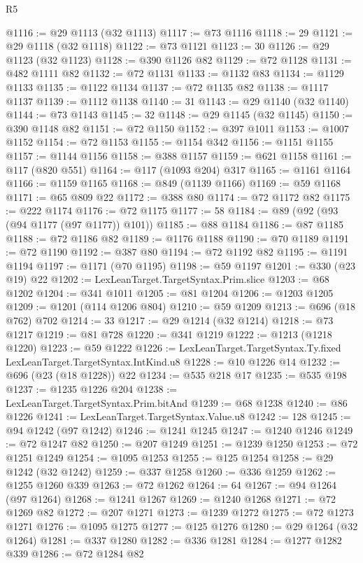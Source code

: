 \begin{lexlean}{R5}
\begin{coremodule}
@1116 := @29 @1113 (@32 @1113)
@1117 := @73 @1116
@1118 := 29
@1121 := @29 @1118 (@32 @1118)
@1122 := @73 @1121
@1123 := 30
@1126 := @29 @1123 (@32 @1123)
@1128 := @390 @1126 @82
@1129 := @72 @1128
@1131 := @482 @1111 @82
@1132 := @72 @1131
@1133 := @1132 @83
@1134 := @1129 @1133
@1135 := @1122 @1134
@1137 := @72 @1135 @82
@1138 := @1117 @1137
@1139 := @1112 @1138
@1140 := 31
@1143 := @29 @1140 (@32 @1140)
@1144 := @73 @1143
@1145 := 32
@1148 := @29 @1145 (@32 @1145)
@1150 := @390 @1148 @82
@1151 := @72 @1150
@1152 := @397 @1011
@1153 := @1007 @1152
@1154 := @72 @1153
@1155 := @1154 @342
@1156 := @1151 @1155
@1157 := @1144 @1156
@1158 := @388 @1157
@1159 := @621 @1158
@1161 := @117 (@820 @551)
@1164 := @117 (@1093 @204) @317
@1165 := @1161 @1164
@1166 := @1159 @1165
@1168 := @849 (@1139 @1166)
@1169 := @59 @1168
@1171 := @65 @809 @22
@1172 := @388 @80
@1174 := @72 @1172 @82
@1175 := @222 @1174
@1176 := @72 @1175
@1177 := 58
@1184 := @89 (@92 (@93 (@94 @1177 (@97 @1177)) @101))
@1185 := @88 @1184
@1186 := @87 @1185
@1188 := @72 @1186 @82
@1189 := @1176 @1188
@1190 := @70 @1189
@1191 := @72 @1190
@1192 := @387 @80
@1194 := @72 @1192 @82
@1195 := @1191 @1194
@1197 := @1171 (@70 @1195)
@1198 := @59 @1197
@1201 := @330 (@23 @19) @22
@1202 := LexLeanTarget.TargetSyntax.Prim.slice
@1203 := @68 @1202
@1204 := @341 @1011
@1205 := @81 @1204
@1206 := @1203 @1205
@1209 := @1201 (@114 @1206 @804)
@1210 := @59 @1209
@1213 := @696 (@18 @762) @702
@1214 := 33
@1217 := @29 @1214 (@32 @1214)
@1218 := @73 @1217
@1219 := @81 @728
@1220 := @341 @1219
@1222 := @1213 (@1218 @1220)
@1223 := @59 @1222
@1226 := LexLeanTarget.TargetSyntax.Ty.fixed LexLeanTarget.TargetSyntax.IntKind.u8
@1228 := @10 @1226 @14
@1232 := @696 (@23 (@18 @1228)) @22
@1234 := @535 @218 @17
@1235 := @535 @198
@1237 := @1235 @1226 @204
@1238 := LexLeanTarget.TargetSyntax.Prim.bitAnd
@1239 := @68 @1238
@1240 := @86 @1226
@1241 := LexLeanTarget.TargetSyntax.Value.u8
@1242 := 128
@1245 := @94 @1242 (@97 @1242)
@1246 := @1241 @1245
@1247 := @1240 @1246
@1249 := @72 @1247 @82
@1250 := @207 @1249
@1251 := @1239 @1250
@1253 := @72 @1251 @1249
@1254 := @1095 @1253
@1255 := @125 @1254
@1258 := @29 @1242 (@32 @1242)
@1259 := @337 @1258
@1260 := @336 @1259
@1262 := @1255 @1260 @339
@1263 := @72 @1262
@1264 := 64
@1267 := @94 @1264 (@97 @1264)
@1268 := @1241 @1267
@1269 := @1240 @1268
@1271 := @72 @1269 @82
@1272 := @207 @1271
@1273 := @1239 @1272
@1275 := @72 @1273 @1271
@1276 := @1095 @1275
@1277 := @125 @1276
@1280 := @29 @1264 (@32 @1264)
@1281 := @337 @1280
@1282 := @336 @1281
@1284 := @1277 @1282 @339
@1286 := @72 @1284 @82

\end{coremodule}
\end{lexlean}
